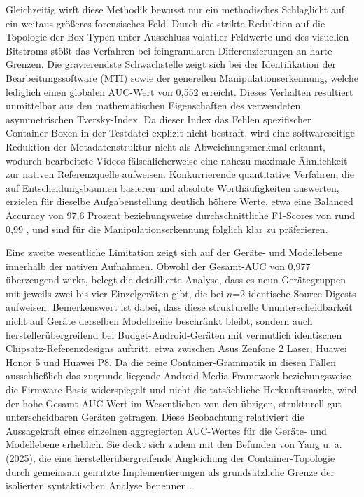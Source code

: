 Gleichzeitig wirft diese Methodik bewusst nur ein methodisches Schlaglicht auf ein weitaus größeres forensisches Feld. Durch die strikte Reduktion auf die Topologie der Box-Typen unter Ausschluss volatiler Feldwerte und des visuellen Bitstroms stößt das Verfahren bei feingranularen Differenzierungen an harte Grenzen. Die gravierendste Schwachstelle zeigt sich bei der Identifikation der Bearbeitungssoftware (MTI) sowie der generellen Manipulationserkennung, welche lediglich einen globalen AUC-Wert von 0,552 erreicht. Dieses Verhalten resultiert unmittelbar aus den mathematischen Eigenschaften des verwendeten asymmetrischen Tversky-Index. Da dieser Index das Fehlen spezifischer Container-Boxen in der Testdatei explizit nicht bestraft, wird eine softwareseitige Reduktion der Metadatenstruktur nicht als Abweichungsmerkmal erkannt, wodurch bearbeitete Videos fälschlicherweise eine nahezu maximale Ähnlichkeit zur nativen Referenzquelle aufweisen. Konkurrierende quantitative Verfahren, die auf Entscheidungsbäumen basieren und absolute Worthäufigkeiten auswerten, erzielen für dieselbe Aufgabenstellung deutlich höhere Werte, etwa eine Balanced Accuracy von 97,6 Prozent \cite[S. 951]{yang_efficient_2020} beziehungsweise durchschnittliche F1-Scores von rund 0,99 \cite[S. 1045]{xiang_forensic_2021}, und sind für die Manipulationserkennung folglich klar zu präferieren.

Eine zweite wesentliche Limitation zeigt sich auf der Geräte- und Modellebene innerhalb der nativen Aufnahmen. Obwohl der Gesamt-AUC von 0,977 überzeugend wirkt, belegt die detaillierte Analyse, dass es neun Gerätegruppen mit jeweils zwei bis vier Einzelgeräten gibt, die bei \(n\)=2 identische Source Digests aufweisen. Bemerkenswert ist dabei, dass diese strukturelle Ununterscheidbarkeit nicht auf Geräte derselben Modellreihe beschränkt bleibt, sondern auch herstellerübergreifend bei Budget-Android-Geräten mit vermutlich identischen Chipsatz-Referenzdesigns auftritt, etwa zwischen Asus Zenfone 2 Laser, Huawei Honor 5 und Huawei P8. Da die reine Container-Grammatik in diesen Fällen ausschließlich das zugrunde liegende Android-Media-Framework beziehungsweise die Firmware-Basis widerspiegelt und nicht die tatsächliche Herkunftsmarke, wird der hohe Gesamt-AUC-Wert im Wesentlichen von den übrigen, strukturell gut unterscheidbaren Geräten getragen. Diese Beobachtung relativiert die Aussagekraft eines einzelnen aggregierten AUC-Wertes für die Geräte- und Modellebene erheblich. Sie deckt sich zudem mit den Befunden von Yang u. a. (2025), die eine herstellerübergreifende Angleichung der Container-Topologie durch gemeinsam genutzte Implementierungen als grundsätzliche Grenze der isolierten syntaktischen Analyse benennen \cite[Kap. 5.4.6]{yang_comprehensive_2025}.

